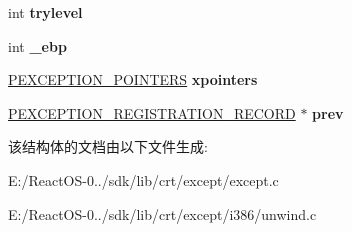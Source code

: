 \begin{DoxyCompactItemize}
int {\bfseries trylevel}
\item 
\mbox{\label{struct___m_s_v_c_r_t___e_x_c_e_p_t_i_o_n___f_r_a_m_e_a77372f87aac602f837bf8746c8c8d910}} 
int {\bfseries \+\_\+ebp}
\item 
\mbox{\label{struct___m_s_v_c_r_t___e_x_c_e_p_t_i_o_n___f_r_a_m_e_a83237fbf656895d053f14fb4c7775653}} 
\hyperlink{struct___e_x_c_e_p_t_i_o_n___p_o_i_n_t_e_r_s}{P\+E\+X\+C\+E\+P\+T\+I\+O\+N\+\_\+\+P\+O\+I\+N\+T\+E\+RS} {\bfseries xpointers}
\item 
\mbox{\label{struct___m_s_v_c_r_t___e_x_c_e_p_t_i_o_n___f_r_a_m_e_a430e20bb00b4fcf0274bd40e78438282}} 
\hyperlink{struct___e_x_c_e_p_t_i_o_n___r_e_g_i_s_t_r_a_t_i_o_n___r_e_c_o_r_d}{P\+E\+X\+C\+E\+P\+T\+I\+O\+N\+\_\+\+R\+E\+G\+I\+S\+T\+R\+A\+T\+I\+O\+N\+\_\+\+R\+E\+C\+O\+RD} $\ast$ {\bfseries prev}
\end{DoxyCompactItemize}


该结构体的文档由以下文件生成\+:\begin{DoxyCompactItemize}
\item 
E\+:/\+React\+O\+S-\/0../sdk/lib/crt/except/except.\+c\item 
E\+:/\+React\+O\+S-\/0../sdk/lib/crt/except/i386/unwind.\+c\end{DoxyCompactItemize}
